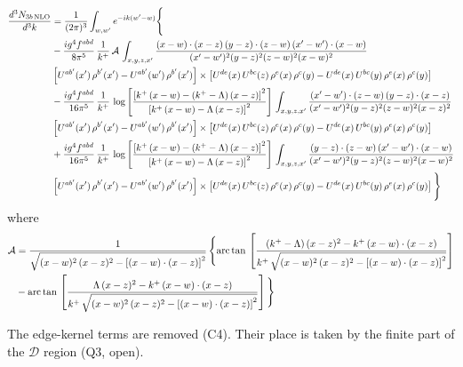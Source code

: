 \documentclass[9pt]{article}
\newcommand{\new}[1]{{\color{blue}#1}}
\numberwithin{equation}{section}
\begin{document}
\begin{align}
\frac{d^{3}N_{3b\,\rm NLO}}{d^{3}k} & =\frac{1}{(2\pi)^{3}}\int_{w,w'}e^{-ik(w'-w)}\Bigg\{\notag \\ &-\frac{ig^{4}f^{abd}}{8\pi^{5}}\,\frac{1}{k^{+}}\,\mathcal{A}\,\int_{x,y,z,x'}
\frac{(x-w)\cdot(x-z)\,(y-z)\cdot(z-w)\,(x'-w')\cdot(x-w)}{(x'-w')^{2}(y-z)^{2}(z-w)^{2}(x-w)^{2}}\notag \\ & \left[U^{ab'}(x')\,\rho^{b'}(x')-U^{ab'}(w')\, \rho^{b'}(x')\right]\times \left[U^{de}(x)\,U^{bc}(z)\, \rho^{e}(x)\,\rho^{c}(y)-U^{de}(x)\,U^{bc}(y)\,\rho^{e}(x)\,\rho^{c}(y)\right]\notag \\ & -\frac{ig^{4}f^{abd}}{16\pi^{5}}\,\frac{1}{k^{+}}\,\log{\left[\frac{\left[k^{+}\,(x-w)-(k^{+}-\Lambda)\,(x-z)\right]^{2}}{\left[k^{+}\,(x-w)-\Lambda\,(x-z)\right]^{2}}\right]}\,\int_{x,y,z,x'}
\frac{(x'-w')\cdot(z-w)\,(y-z)\cdot(x-z)}{(x'-w')^{2}(y-z)^{2}(z-w)^{2}(x-z)^{2}}\notag \\
&\left[U^{ab'}(x')\,\rho^{b'}(x')-U^{ab'}(w')\, \rho^{b'}(x')\right]\times \left[U^{de}(x)\,U^{bc}(z)\, \rho^{e}(x)\,\rho^{c}(y)-U^{de}(x)\,U^{bc}(y)\,\rho^{e}(x)\,\rho^{c}(y)\right]\notag \\ &+ \frac{ig^{4}f^{abd}}{16\pi^{5}}\,\frac{1}{k^{+}}\,\log{\left[\frac{\left[k^{+}\,(x-w)-(k^{+}-\Lambda)\,(x-z)\right]^{2}}{\left[k^{+}\,(x-w)-\Lambda\,(x-z)\right]^{2}}\right]}\,\int_{x,y,z,x'}
\frac{(y-z)\cdot(z-w)\,(x'-w')\cdot(x-w)}{(x'-w')^{2}(y-z)^{2}(z-w)^{2}(x-w)^{2}}\notag \\ 
& \left[U^{ab'}(x')\,\rho^{b'}(x')-U^{ab'}(w')\, \rho^{b'}(x')\right]\times \left[U^{de}(x)\,U^{bc}(z)\, \rho^{e}(x)\,\rho^{c}(y)-U^{de}(x)\,U^{bc}(y)\,\rho^{e}(x)\,\rho^{c}(y)\right]\Bigg\}
\end{align}
where 
\begin{align}
\mathcal{A} & = \frac{1}{\sqrt{(x-w)^{2}\,(x-z)^{2}-\left[(x-w)\cdot (x-z)\right]^{2}}}\, \Bigg\{\mathrm{arc\,tan}\,\left[\frac{(k^{+}-\Lambda)\,(x-z)^{2}-k^{+}\,(x-w)\cdot (x-z)}{k^{+}\,\sqrt{(x-w)^{2}\,(x-z)^{2}-\left[(x-w)\cdot (x-z)\right]^{2}}}\right]\notag \\ & - \mathrm{arc\,tan}\,\left[\frac{\Lambda\,(x-z)^{2}-k^{+}\,(x-w)\cdot (x-z)}{k^{+}\,\sqrt{(x-w)^{2}\,(x-z)^{2}-\left[(x-w)\cdot (x-z)\right]^{2}}}\right] \Bigg\} \nonumber
\end{align}

\new{The edge-kernel terms are removed (C4). Their place is taken by the finite part of the $\mathcal D$ region (Q3, open).}
\end{document}
